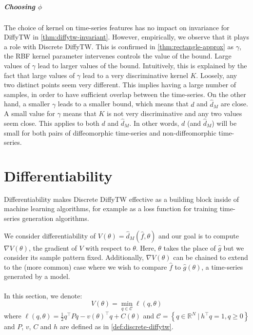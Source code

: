 \subparagraph{Choosing $\phi$} The choice of kernel on time-series features has no impact on invariance for DiffyTW in \cref{thm:diffytw-invariant}. However, empirically, we observe that it plays a role with Discrete DiffyTW. This is confirmed in \cref{thm:rectangle-approx} as $\gamma$, the RBF kernel parameter intervenes controls the value of the bound. Large values of $\gamma$ lead to larger values of the bound. Intuitively, this is explained by the fact that large values of $\gamma$ lead to a very discriminative kernel $K$. Loosely, any two distinct points seem very different. This implies having a large number of samples, in order to have sufficient overlap between the time-series. On the other hand, a smaller $\gamma$ leads to a smaller bound, which means that $d$ and $\hat d_M$ are close. A small value for $\gamma$ means that $K$ is not very discriminative and any two values seem close. This applies to both $d$ and $\hat d_M$. In other words, $d$ (and $\hat d_M$) will be small for both pairs of diffeomorphic time-series and non-diffeomorphic time-series.

\section{Differentiability}
Differentiability makes Discrete DiffyTW effective as a building block inside of machine learning algorithms, for example as a loss function for training time-series generation algorithms.

We consider differentiability of $V(\theta) = \hat d_M(\hat f, \theta)$ and our goal is to compute $\nabla V(\theta)$, the gradient of $V$ with respect to $\theta$. Here, $\theta$ takes the place of $\hat g$ but we consider its sample pattern fixed. Additionally, $\nabla V(\theta)$ can be chained to extend to the (more common) case where we wish to compare $\hat f$ to $\hat g(\theta)$, a time-series generated by a model.

\paragraph{}
In this section, we denote:
\begin{equation}\label{prob:fullqp}
    V(\theta) = \min_{q\in\mathcal C} \ell(q, \theta)
\end{equation}
where $\ell(q, \theta) = \frac{1}{2} q^\top Pq - v(\theta)^\top q + C(\theta)$ and $\mathcal C = \left\lbrace q\in\mathbb R^N ~\vert~ h^\top q=1, q \geq 0\right\rbrace$ and $P$, $v$, $C$ and $h$ are defined as in \cref{def:discrete-diffytw}.

